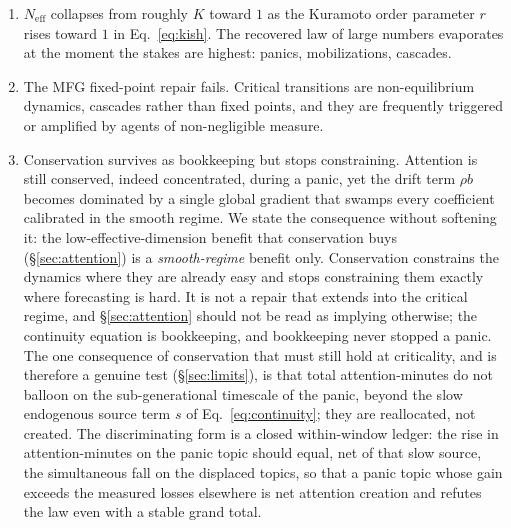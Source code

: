 \documentclass[11pt]{article}
\begin{document}
\begin{enumerate}[label=(\alph*),itemsep=2pt]
\item $N_{\mathrm{eff}}$ collapses from roughly $K$ toward $1$ as the Kuramoto order parameter $r$ rises toward $1$ in Eq.~\eqref{eq:kish}. The recovered law of large numbers evaporates at the moment the stakes are highest: panics, mobilizations, cascades.
\item The MFG fixed-point repair fails. Critical transitions are non-equilibrium dynamics, cascades rather than fixed points, and they are frequently triggered or amplified by agents of non-negligible measure.
\item Conservation survives as bookkeeping but stops constraining. Attention is still conserved, indeed concentrated, during a panic, yet the drift term $\rho b$ becomes dominated by a single global gradient that swamps every coefficient calibrated in the smooth regime. We state the consequence without softening it: the low-effective-dimension benefit that conservation buys (\S\ref{sec:attention}) is a \emph{smooth-regime} benefit only. Conservation constrains the dynamics where they are already easy and stops constraining them exactly where forecasting is hard. It is not a repair that extends into the critical regime, and \S\ref{sec:attention} should not be read as implying otherwise; the continuity equation is bookkeeping, and bookkeeping never stopped a panic. The one consequence of conservation that must still hold at criticality, and is therefore a genuine test (\S\ref{sec:limits}), is that total attention-minutes do not balloon on the sub-generational timescale of the panic, beyond the slow endogenous source term $s$ of Eq.~\eqref{eq:continuity}; they are reallocated, not created. The discriminating form is a closed within-window ledger: the rise in attention-minutes on the panic topic should equal, net of that slow source, the simultaneous fall on the displaced topics, so that a panic topic whose gain exceeds the measured losses elsewhere is net attention creation and refutes the law even with a stable grand total.
\end{enumerate}
\end{document}
